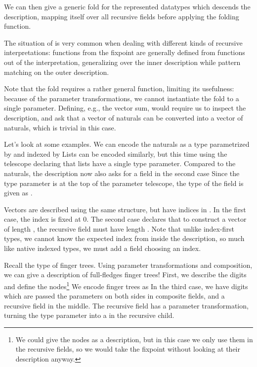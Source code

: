We can then give a generic fold for the represented datatypes
which descends the description, mapping itself over all recursive fields before applying the folding function.
\begin{remark}
    The situation of  is very common when dealing with different kinds of recursive interpretations: functions from the fixpoint are generally defined from functions out of the interpretation, generalizing over the inner description while pattern matching on the outer description. 
\end{remark}
Note that the fold requires a rather general function, limiting its usefulness: because of the parameter transformations, we cannot instantiate the fold to a single parameter. Defining, e.g., the vector sum, would require us to inspect the description, and ask that a vector of naturals can be converted into a vector of naturals, which is trivial in this case.


Let's look at some examples. We can encode the naturals as a type parametrized by  and indexed by 
Lists can be encoded similarly, but this time using the telescope
declaring that lists have a single type parameter. Compared to the naturals, the description now also asks for a field in the second case
Since the type parameter is at the top of the parameter telescope, the type of the field is given as .

Vectors are described using the same structure, but have indices in \bN{}.
In the first case, the index is fixed at 0. The second case declares that to construct a vector of length , the recursive field must have length . Note that unlike index-first types, we cannot know the expected index from inside the description, so much like native indexed types, we must add a field choosing an index.

Recall the type of finger trees. Using parameter transformations and composition, we can give a description of full-fledges finger trees! First, we describe the digits
and define the nodes\footnote{We could give the nodes as a description, but in this case we only use them in the recursive fields, so we would take the fixpoint without looking at their description anyway.}
We encode finger trees as
In the third case, we have digits which are passed the parameters on both sides in composite fields, and a recursive field in the middle. The recursive field has a parameter transformation, turning the type parameter  into a  in the recursive child.

